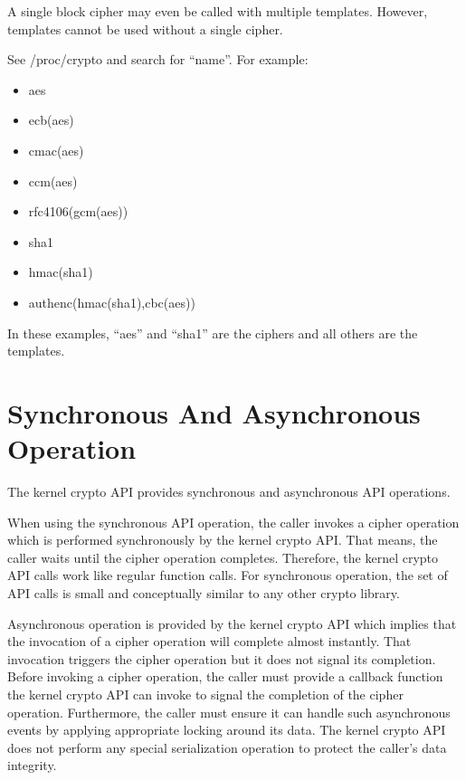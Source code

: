 \documentclass[a4paper,8pt,english]{sphinxmanual}
\begin{document}
A single block cipher may even be called with multiple templates.
However, templates cannot be used without a single cipher.

See /proc/crypto and search for ``name''. For example:
\begin{itemize}
\item {} 
aes

\item {} 
ecb(aes)

\item {} 
cmac(aes)

\item {} 
ccm(aes)

\item {} 
rfc4106(gcm(aes))

\item {} 
sha1

\item {} 
hmac(sha1)

\item {} 
authenc(hmac(sha1),cbc(aes))

\end{itemize}

In these examples, ``aes'' and ``sha1'' are the ciphers and all others are
the templates.


\section{Synchronous And Asynchronous Operation}
\label{crypto/architecture:synchronous-and-asynchronous-operation}
The kernel crypto API provides synchronous and asynchronous API
operations.

When using the synchronous API operation, the caller invokes a cipher
operation which is performed synchronously by the kernel crypto API.
That means, the caller waits until the cipher operation completes.
Therefore, the kernel crypto API calls work like regular function calls.
For synchronous operation, the set of API calls is small and
conceptually similar to any other crypto library.

Asynchronous operation is provided by the kernel crypto API which
implies that the invocation of a cipher operation will complete almost
instantly. That invocation triggers the cipher operation but it does not
signal its completion. Before invoking a cipher operation, the caller
must provide a callback function the kernel crypto API can invoke to
signal the completion of the cipher operation. Furthermore, the caller
must ensure it can handle such asynchronous events by applying
appropriate locking around its data. The kernel crypto API does not
perform any special serialization operation to protect the caller's data
integrity.
\end{document}
